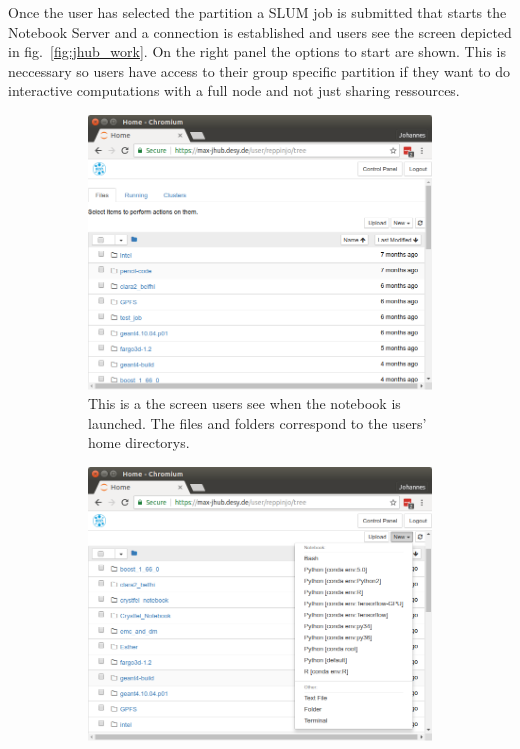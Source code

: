 \documentclass[10pt]{scrartcl}
\begin{document}
%
Once the user has selected the partition a SLUM job is submitted that starts the Notebook Server and a connection is established and users see the screen depicted in fig.~\ref{fig:jhub_work}. On the right panel the options to start are shown. This is neccessary so users have access to their group specific partition if they want to do interactive computations with a full node and not just sharing ressources.
%
\begin{figure}
  \centering
    \begin{subfigure}{0.45\textwidth} %
	  \includegraphics[width=\textwidth]{figures/jhub006.png}
	  \caption{This is a the screen users see when the notebook is launched. The files and folders correspond to the users' home directorys.} %
  \end{subfigure}
  \vspace{1em} %
  \begin{subfigure}{0.45\textwidth} %
	  \includegraphics[width=\textwidth]{figures/jhub007.png}

\end{subfigure}
\end{figure}
\end{document}
